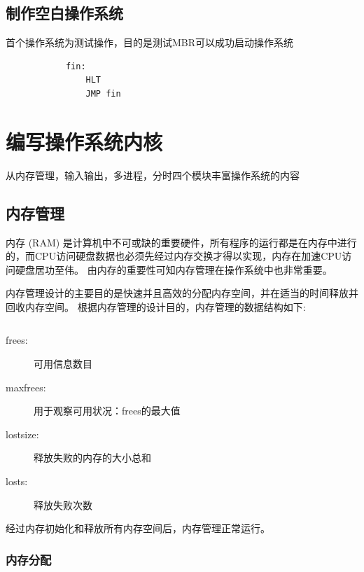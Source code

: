 \documentclass{swfcthesis}
\begin{document}
		\inputminted[tabsize=2, firstline=76, lastline=88,
		linenos=true]{nasm}{../ZOS/src/kernel/ipl09.nas}
	
	\begin{listing}[H]
		\inputminted[tabsize=2, firstline=125, lastline=147,
		linenos=true]{nasm}{../ZOS/src/kernel/ipl09.nas}
	\end{listing}

	\section{制作空白操作系统}
	首个操作系统为测试操作，目的是测试MBR可以成功启动操作系统
	\begin{verbatim}
			fin:
			    HLT
			    JMP fin
	\end{verbatim}
		
\chapter{编写操作系统内核}
	从内存管理，输入输出，多进程，分时四个模块丰富操作系统的内容
	\section{内存管理}
		内存 (RAM) 是计算机中不可或缺的重要硬件，所有程序的运行都是在内存中进行的，而CPU访问硬盘数据也必须先经过内存交换才得以实现，内存在加速CPU访问硬盘居功至伟。
		由内存的重要性可知内存管理在操作系统中也非常重要。	
		
		内存管理设计的主要目的是快速并且高效的分配内存空间，并在适当的时间释放并回收内存空间。
		根据内存管理的设计目的，内存管理的数据结构如下:
		\inputminted[tabsize=2, firstline=137, lastline=143,
		linenos=true]{c}{../ZOS/src/kernel/bootpack.h}
		
		\begin{description}
			\item[frees:]可用信息数目
			\item[maxfrees:]用于观察可用状况：frees的最大值
			\item[lostsize:]释放失败的内存的大小总和
			\item[losts:]释放失败次数
		\end{description}
		
		经过内存初始化和释放所有内存空间后，内存管理正常运行。
		
		\subsection{内存分配}
\end{document}
